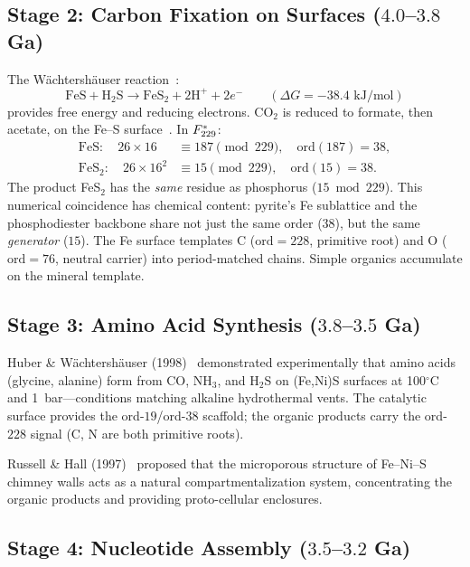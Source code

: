 \subsection{Stage 2: Carbon Fixation on Surfaces ($4.0$--$3.8$ Ga)}

The W\"achtersh\"auser reaction~\cite{Wachtershauser88}:
\begin{equation}\label{eq:wacht}
    \text{FeS} + \text{H}_2\text{S} \longrightarrow \text{FeS}_2 + 2\text{H}^+ + 2e^- \qquad (\Delta G = -38.4 \text{ kJ/mol})
\end{equation}
provides free energy and reducing electrons. CO$_2$ is reduced to formate, then acetate, on the Fe--S surface~\cite{Huber97}. In $F_{229}^*$:
\begin{align}
\mathrm{FeS}: \quad 26 \times 16 &\equiv 187 \pmod{229}, \quad \mathrm{ord}(187) = 38, \\
\mathrm{FeS}_2: \quad 26 \times 16^2 &\equiv 15 \pmod{229}, \quad \mathrm{ord}(15) = 38.
\end{align}
The product FeS$_2$ has the \emph{same} residue as phosphorus ($15 \bmod 229$). This numerical coincidence has chemical content: pyrite's Fe sublattice and the phosphodiester backbone share not just the same order ($38$), but the same \emph{generator} ($15$). The Fe surface templates C ($\mathrm{ord} = 228$, primitive root) and O ($\mathrm{ord} = 76$, neutral carrier) into period-matched chains. Simple organics accumulate on the mineral template.

\subsection{Stage 3: Amino Acid Synthesis ($3.8$--$3.5$ Ga)}

Huber \& W\"achtersh\"auser (1998)~\cite{Huber98} demonstrated experimentally that amino acids (glycine, alanine) form from CO, NH$_3$, and H$_2$S on (Fe,Ni)S surfaces at 100$^\circ$C and 1~bar---conditions matching alkaline hydrothermal vents. The catalytic surface provides the ord-$19$/ord-$38$ scaffold; the organic products carry the ord-$228$ signal (C, N are both primitive roots).

Russell \& Hall (1997)~\cite{Russell97} proposed that the microporous structure of Fe--Ni--S chimney walls acts as a natural compartmentalization system, concentrating the organic products and providing proto-cellular enclosures.

\subsection{Stage 4: Nucleotide Assembly ($3.5$--$3.2$ Ga)}

